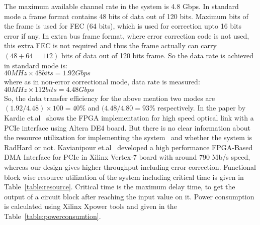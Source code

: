 \documentclass[10pt, conference, compsocconf]{IEEEtran}
\begin{document}
The maximum available channel rate in the system is 4.8 Gbps. In standard mode a frame format contains 48 bits of data out of 120 bits. Maximum bits of the frame is used for FEC (64 bits), which is used for correction upto 16 bits error if any. In extra bus frame format, where error correction code is not used, this extra FEC is not required and thus the frame actually can carry $(48+64=112)$ bits of data out of 120 bits frame.
So the data rate is achieved in standard mode is: \\
$ 40 MHz \times 48 bits = 1.92 Gbps$ \\
where as in non-error correctional mode, data rate is measured: \\
$40 MHz \times 112 bits = 4.48 Gbps$ \\
So, the data transfer efficiency for the above mention two modes are $(1.92/4.48)\times 100 = 40\%$ and $(4.48/4.80 = 93\% $ respectively.
In the paper by Kardic et.al~\cite{Kardic:PCIe:SOCC12} shows the FPGA implementation for high speed optical link with a PCIe interface using Altera DE4 board. But there is no clear information about the resource utilization for implementing the system~\cite{Kardic:PCIe:SOCC12} and whether the system is RadHard or not. Kavianipour et.al~\cite{Kavianipour:IeeeTrans} developed a high performance FPGA-Based DMA Interface for PCIe in Xilinx Vertex-7 board with around 790 Mb/s speed, whereas our design gives higher throughput including error correction. Functional block wise resource utilization of the system including critical time is given in Table~\ref{table:resource}. Critical time is the maximum delay time, to get the output of a circuit block after reaching the input value on it. Power consumption is calculated using Xilinx Xpower tools and given in the Table~\ref{table:powerconsumtion}. 
\end{document}
